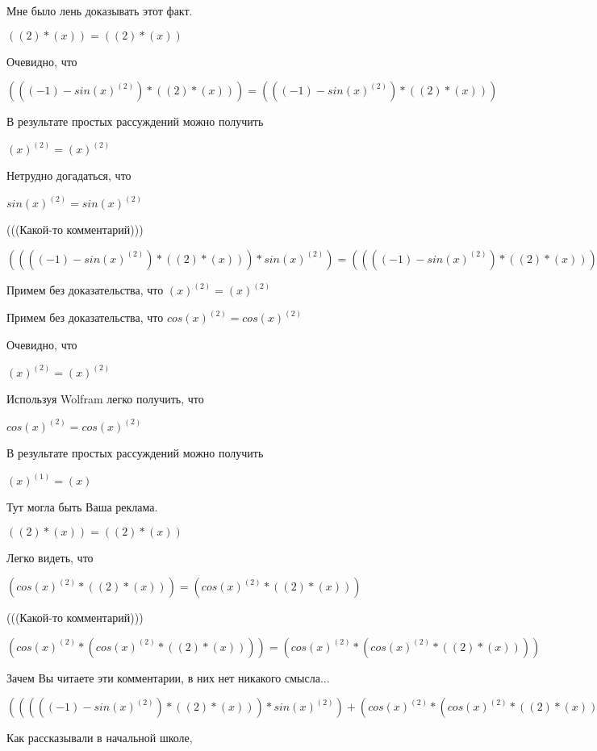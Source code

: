 \documentclass[12pt,a4paper,fleqn]{article}
\theoremstyle{definition}
\begin{document}
Мне было лень доказывать этот факт.

$(( 2 ) * ( x )) = (( 2 ) * ( x ))$

Очевидно, что

$((( -1 ) - sin{( x )}^{( 2 )}) * (( 2 ) * ( x ))) = ((( -1 ) - sin{( x )}^{( 2 )}) * (( 2 ) * ( x )))$

В результате простых рассуждений можно получить

${( x )}^{( 2 )} = {( x )}^{( 2 )}$

Нетрудно догадаться, что

$sin{( x )}^{( 2 )} = sin{( x )}^{( 2 )}$

(((Какой-то комментарий)))

$(((( -1 ) - sin{( x )}^{( 2 )}) * (( 2 ) * ( x ))) * sin{( x )}^{( 2 )}) = (((( -1 ) - sin{( x )}^{( 2 )}) * (( 2 ) * ( x ))) * sin{( x )}^{( 2 )})$

Примем без доказательства, что
${( x )}^{( 2 )} = {( x )}^{( 2 )}$

Примем без доказательства, что
$cos{( x )}^{( 2 )} = cos{( x )}^{( 2 )}$

Очевидно, что

${( x )}^{( 2 )} = {( x )}^{( 2 )}$

Используя Wolfram легко получить, что

$cos{( x )}^{( 2 )} = cos{( x )}^{( 2 )}$

В результате простых рассуждений можно получить

${( x )}^{( 1 )} = ( x )$

Тут могла быть Ваша реклама.

$(( 2 ) * ( x )) = (( 2 ) * ( x ))$

Легко видеть, что

$(cos{( x )}^{( 2 )} * (( 2 ) * ( x ))) = (cos{( x )}^{( 2 )} * (( 2 ) * ( x )))$

(((Какой-то комментарий)))

$(cos{( x )}^{( 2 )} * (cos{( x )}^{( 2 )} * (( 2 ) * ( x )))) = (cos{( x )}^{( 2 )} * (cos{( x )}^{( 2 )} * (( 2 ) * ( x ))))$

Зачем Вы читаете эти комментарии, в них нет никакого смысла...

$((((( -1 ) - sin{( x )}^{( 2 )}) * (( 2 ) * ( x ))) * sin{( x )}^{( 2 )}) + (cos{( x )}^{( 2 )} * (cos{( x )}^{( 2 )} * (( 2 ) * ( x ))))) = ((((( -1 ) - sin{( x )}^{( 2 )}) * (( 2 ) * ( x ))) * sin{( x )}^{( 2 )}) + (cos{( x )}^{( 2 )} * (cos{( x )}^{( 2 )} * (( 2 ) * ( x )))))$

Как рассказывали в начальной школе,
\end{document}
